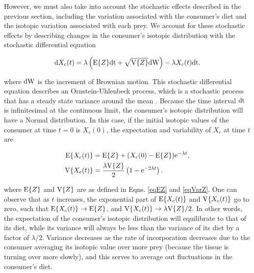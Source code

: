 \documentclass{frontiersSCNS}
\begin{document}

However, we must also take into account the stochastic effects described in the previous section, including the variation associated with the consumer's diet and the isotopic variation associated with each prey.
We account for these stochastic effects by describing changes in the consumer's isotopic distribution with the stochastic differential equation

\begin{equation}
\label{eqSDE}
{\rm d}X_c(t) = \lambda\left({\rm E}\{Z\}{\rm dt} + \sqrt{{\rm V}\{Z\}}{\rm dW}\right) - \lambda X_c(t){\rm dt}.
\end{equation}

\noindent where ${\rm dW}$ is the increment of Brownian motion.
This stochastic differential equation describes an Ornstein-Uhlenbeck process, which is a stochastic process that has a steady state variance around the mean \citep{Mangel:2006wa}.
Because the time interval ${\rm dt}$ is infinitesimal at the continuous limit, the consumer's isotopic distribution will have a Normal distribution.
In this case, if the initial isotopic values of the consumer at time $t=0$ is $X_c(0)$, the expectation and variability of $X_c$ at time $t$ are

\begin{align}
  \begin{split}
    \label{eqEVar}
{\rm E}\{X_c(t)\} &= {\rm E}\{Z\} + (X_c(0) - {\rm E}\{Z\}){\rm e}^{-\lambda t},\\
{\rm V}\{X_c(t)\} &= \frac{\lambda {\rm V}\{Z\}}{2}\left(1 - {\rm e}^{-2\lambda t}\right).
\end{split}
\end{align}

\noindent where ${\rm E}\{Z\}$ and ${\rm V}\{Z\}$ are as defined in Eqns. \ref{eqEZ} and \ref{eqVarZ}.
One can observe that as $t$ increases, the exponential part of ${\rm E}\{X_c(t)\}$ and ${\rm V}\{X_c(t)\}$ go to zero, such that ${\rm E}\{X_c(t)\} \to {\rm E}\{Z\}$, and ${\rm V}\{X_c(t)\} \to \lambda{\rm V}\{Z\}/2$.
In other words, the expectation of the consumer's isotopic distribution will equilibrate to that of its diet, while its variance will always be less than the variance of its diet by a factor of $\lambda/2$.
Variance decreases as the rate of incorporation decreases due to the consumer averaging its isotopic value over more prey (because the tissue is turning over more slowly), and this serves to average out fluctuations in the consumer's diet.
\end{document}
